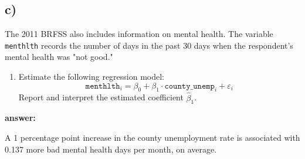 \documentclass[12pt]{article}
\begin{document}
\subsection*{c)}

The 2011 BRFSS also includes information on mental health. The variable \texttt{menthlth} records the number of days in the past 30 days when the respondent’s mental health was "not good."

\begin{enumerate}
    \item Estimate the following regression model:
    \[
    \texttt{menthlth}_i = \beta_0 + \beta_1 \cdot \texttt{county\_unemp}_i + \varepsilon_i
    \]
    Report and interpret the estimated coefficient $\hat\beta_1$.
\end{enumerate}
\textbf{answer:}

A 1 percentage point increase in the county unemployment rate is associated with 0.137 more bad mental health days per month, on average.
\end{document}
